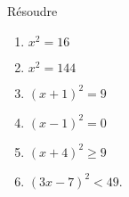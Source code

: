
\begin{exercice}\label{exosmath-0177}

Résoudre
\begin{multicols}{3}
    \begin{enumerate}
        \item
            \( x^2=16\)
        \item
            \( x^2=144\)
        \item
            \( (x+1)^2=9\)
        \item
            \( (x-1)^2=0\)
        \item
            \( (x+4)^2\geq 9\)
        \item
            \( (3x-7)^2<49\).
    \end{enumerate}
\end{multicols}

\end{exercice}
